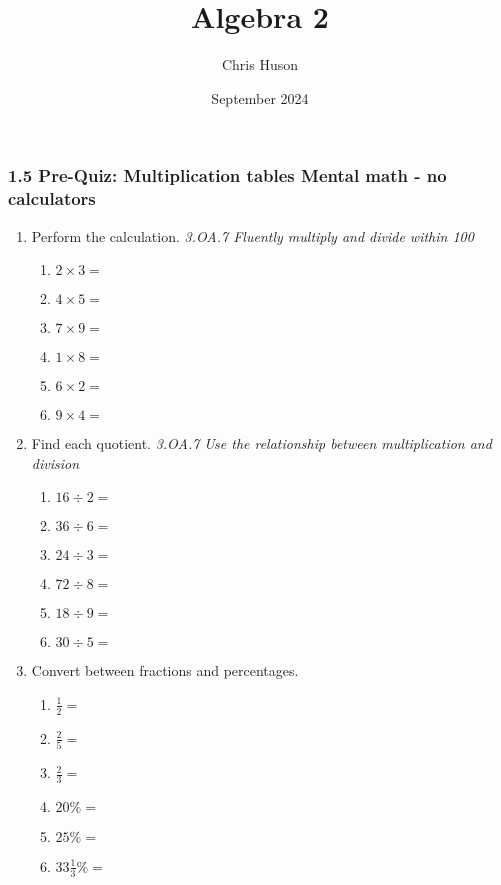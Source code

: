 \documentclass[12pt, twoside]{article}
\title{Algebra 2}
\author{Chris Huson}
\date{September 2024}
\begin{document}
\subsubsection*{1.5 Pre-Quiz: Multiplication tables \hfill Mental math - no calculators}
\begin{enumerate}[itemsep=0.5cm]

\item Perform the calculation. \hfill \emph{3.OA.7 Fluently multiply and divide within 100}
    \begin{multicols}{2}
        \begin{enumerate}[itemsep=0.5cm]
            \item $2 \times 3 =$
            \item $4 \times 5 =$
            \item $7 \times 9 =$
            \item $1 \times 8 =$
            \item $6 \times 2 =$
            \item $9 \times 4 =$
        \end{enumerate}
    \end{multicols}

\item Find each quotient. \hfill \emph{3.OA.7 Use the relationship between multiplication and division}
    \begin{multicols}{2}
        \begin{enumerate}[itemsep=0.5cm]
            \item $16 \div 2 =$
            \item $36 \div 6 =$
            \item $24 \div 3 =$
            \item $72 \div 8 =$
            \item $18 \div 9 =$
            \item $30 \div 5 =$
        \end{enumerate}
    \end{multicols}

\item Convert between fractions and percentages.
\begin{multicols}{2}
\begin{enumerate}[itemsep=0.5cm]
    \item $\frac{1}{2}=$
    \item $\frac{2}{5}=$
    \item $\frac{2}{3}=$
    \item $20\% =$
    \item $25\% =$
    \item $33 \frac{1}{3}\% =$
\end{enumerate}
\end{multicols}


\end{enumerate}
\end{document}
